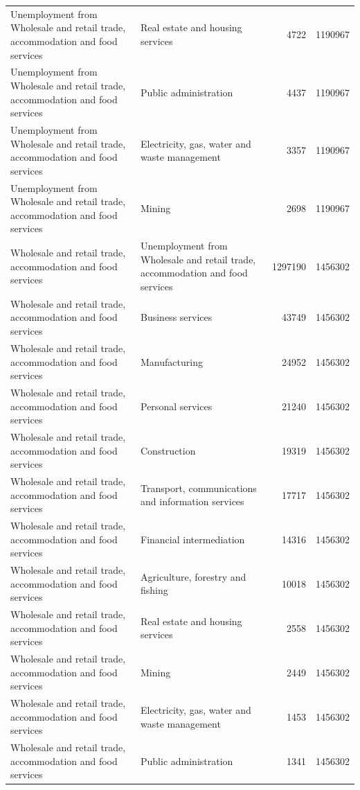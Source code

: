 \begin{longtable}{llrr}
Unemployment from Wholesale and retail trade, accommodation and food services & Real estate and housing services & 4722 & 1190967 \\
Unemployment from Wholesale and retail trade, accommodation and food services & Public administration & 4437 & 1190967 \\
Unemployment from Wholesale and retail trade, accommodation and food services & Electricity, gas, water and waste management & 3357 & 1190967 \\
Unemployment from Wholesale and retail trade, accommodation and food services & Mining & 2698 & 1190967 \\
Wholesale and retail trade, accommodation and food services & Unemployment from Wholesale and retail trade, accommodation and food services & 1297190 & 1456302 \\
Wholesale and retail trade, accommodation and food services & Business services & 43749 & 1456302 \\
Wholesale and retail trade, accommodation and food services & Manufacturing & 24952 & 1456302 \\
Wholesale and retail trade, accommodation and food services & Personal services & 21240 & 1456302 \\
Wholesale and retail trade, accommodation and food services & Construction & 19319 & 1456302 \\
Wholesale and retail trade, accommodation and food services & Transport, communications and information services & 17717 & 1456302 \\
Wholesale and retail trade, accommodation and food services & Financial intermediation & 14316 & 1456302 \\
Wholesale and retail trade, accommodation and food services & Agriculture, forestry and fishing & 10018 & 1456302 \\
Wholesale and retail trade, accommodation and food services & Real estate and housing services & 2558 & 1456302 \\
Wholesale and retail trade, accommodation and food services & Mining & 2449 & 1456302 \\
Wholesale and retail trade, accommodation and food services & Electricity, gas, water and waste management & 1453 & 1456302 \\
Wholesale and retail trade, accommodation and food services & Public administration & 1341 & 1456302 \\
\end{longtable}
